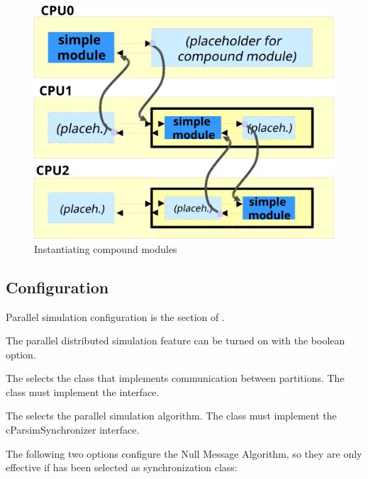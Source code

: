 \begin{figure}[htbp]
  \begin{center}
    \includegraphics{figures/parsim-placeholders2}
    \caption{Instantiating compound modules}
    \label{fig:inst}
  \end{center}
\end{figure}



\subsection{Configuration}

Parallel simulation configuration is the \ttt{[General]} section of .

The parallel distributed simulation feature can be turned on with the
 boolean option.

The  selects the class that implements
communication between partitions. The class must implement the
 interface.


The  selects the parallel simulation algorithm.
The class must implement the cParsimSynchronizer interface.


The following two options configure the Null Message Algorithm, so
they are only effective if  has been selected
as synchronization class:

